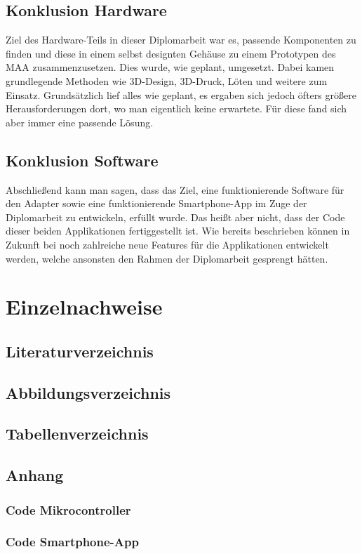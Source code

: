 \documentclass[11pt, twoside]{article}
\begin{document}
\subsection{Konklusion Hardware}
Ziel des Hardware-Teils in dieser Diplomarbeit war es, passende Komponenten zu finden und diese in einem selbst designten Gehäuse zu einem Prototypen des MAA zusammenzusetzen. Dies wurde, wie geplant, umgesetzt. Dabei kamen grundlegende Methoden wie 3D-Design, 3D-Druck, Löten und weitere zum Einsatz. Grundsätzlich lief alles wie geplant, es ergaben sich jedoch öfters größere Herausforderungen dort, wo man eigentlich keine erwartete. Für diese fand sich aber immer eine passende Lösung.
\subsection{Konklusion Software}
Abschließend kann man sagen, dass das Ziel, eine funktionierende Software für den Adapter sowie eine funktionierende Smartphone-App im Zuge der Diplomarbeit zu entwickeln, erfüllt wurde. Das heißt aber nicht, dass der Code dieser beiden Applikationen fertiggestellt ist. Wie bereits beschrieben können in Zukunft bei noch zahlreiche neue Features für die Applikationen entwickelt werden, welche ansonsten den Rahmen der Diplomarbeit gesprengt hätten.
\newpage
\section{Einzelnachweise}
\subsection{Literaturverzeichnis}
\printbibliography
\newpage
\subsection{Abbildungsverzeichnis}
\listoffigures
\subsection{Tabellenverzeichnis}
\listoftables
\newpage
\subsection{Anhang}
\subsubsection{Code Mikrocontroller}
\subsubsection{Code Smartphone-App}
\end{document}
